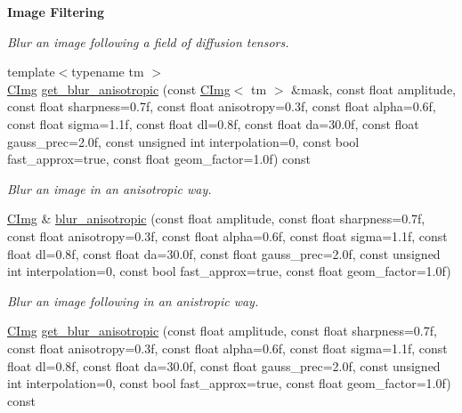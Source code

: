 \begin{Indent}{\bf Image Filtering}
\begin{DoxyCompactItemize}
\begin{DoxyCompactList}\small\item\em Blur an image following a field of diffusion tensors. \item\end{DoxyCompactList}\item 
{\footnotesize template$<$typename tm $>$ }\\\hyperlink{structcimg__library_1_1_c_img}{CImg} \hyperlink{structcimg__library_1_1_c_img_a193ec9934423df0d91f2fbfbd8edd41d}{get\_\-blur\_\-anisotropic} (const \hyperlink{structcimg__library_1_1_c_img}{CImg}$<$ tm $>$ \&mask, const float amplitude, const float sharpness=0.7f, const float anisotropy=0.3f, const float alpha=0.6f, const float sigma=1.1f, const float dl=0.8f, const float da=30.0f, const float gauss\_\-prec=2.0f, const unsigned int interpolation=0, const bool fast\_\-approx=true, const float geom\_\-factor=1.0f) const 
\begin{DoxyCompactList}\small\item\em Blur an image in an anisotropic way. \item\end{DoxyCompactList}\item 
\hypertarget{structcimg__library_1_1_c_img_ae1f84575eb2f9ab5a5747ecdbb42a099}{
\hyperlink{structcimg__library_1_1_c_img}{CImg} \& \hyperlink{structcimg__library_1_1_c_img_ae1f84575eb2f9ab5a5747ecdbb42a099}{blur\_\-anisotropic} (const float amplitude, const float sharpness=0.7f, const float anisotropy=0.3f, const float alpha=0.6f, const float sigma=1.1f, const float dl=0.8f, const float da=30.0f, const float gauss\_\-prec=2.0f, const unsigned int interpolation=0, const bool fast\_\-approx=true, const float geom\_\-factor=1.0f)}
\label{structcimg__library_1_1_c_img_ae1f84575eb2f9ab5a5747ecdbb42a099}

\begin{DoxyCompactList}\small\item\em Blur an image following in an anistropic way. \item\end{DoxyCompactList}\item 
\hypertarget{structcimg__library_1_1_c_img_a3f67a441b852f4adf1f65816851d6b37}{
\hyperlink{structcimg__library_1_1_c_img}{CImg} \hyperlink{structcimg__library_1_1_c_img_a3f67a441b852f4adf1f65816851d6b37}{get\_\-blur\_\-anisotropic} (const float amplitude, const float sharpness=0.7f, const float anisotropy=0.3f, const float alpha=0.6f, const float sigma=1.1f, const float dl=0.8f, const float da=30.0f, const float gauss\_\-prec=2.0f, const unsigned int interpolation=0, const bool fast\_\-approx=true, const float geom\_\-factor=1.0f) const }
\label{structcimg__library_1_1_c_img_a3f67a441b852f4adf1f65816851d6b37}


\end{DoxyCompactItemize}
\end{Indent}
